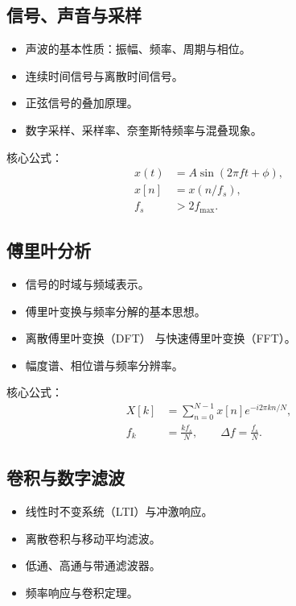 \documentclass[12pt,fontset=none]{ctexart}
\begin{document}
\subsection{信号、声音与采样}

\begin{itemize}
  \item 声波的基本性质：振幅、频率、周期与相位。
  \item 连续时间信号与离散时间信号。
  \item 正弦信号的叠加原理。
  \item 数字采样、采样率、奈奎斯特频率与混叠现象。
\end{itemize}

核心公式：
\begin{align*}
x(t) &= A\sin(2\pi ft+\phi),\\
x[n] &= x(n/f_s),\\
f_s &> 2f_{\max}.
\end{align*}

\subsection{傅里叶分析}

\begin{itemize}
  \item 信号的时域与频域表示。
  \item 傅里叶变换与频率分解的基本思想。
  \item 离散傅里叶变换（DFT）
  与快速傅里叶变换（FFT）。
  \item 幅度谱、相位谱与频率分辨率。
\end{itemize}

核心公式：
\begin{align*}
X[k] &= \sum_{n=0}^{N-1}
x[n]e^{-i2\pi kn/N},\\
f_k &= \frac{kf_s}{N},\qquad
\Delta f = \frac{f_s}{N}.
\end{align*}

\subsection{卷积与数字滤波}

\begin{itemize}
  \item 线性时不变系统（LTI）与冲激响应。
  \item 离散卷积与移动平均滤波。
  \item 低通、高通与带通滤波器。
  \item 频率响应与卷积定理。
\end{itemize}
\end{document}
